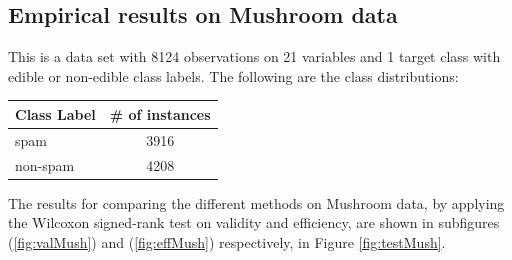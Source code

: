 \documentclass[main]{subfiles}
\begin{document}
\newpage

\subsection{Empirical results on Mushroom data}
This is a data set with 8124 observations on 21 variables and 1 target class with edible or non-edible class labels. The following are the class distributions:

\begin{center} 

\begin{tabular}{l|c}
Class Label & \# of instances \\
\toprule
spam &  3916\\
non-spam &  4208\\
\end{tabular}
\end{center}

The results for comparing the different methods on Mushroom data, by applying the Wilcoxon signed-rank test on validity and efficiency, are shown in subfigures (\ref{fig:valMush}) and (\ref{fig:effMush}) respectively, in Figure \ref{fig:testMush}.
\end{document}

